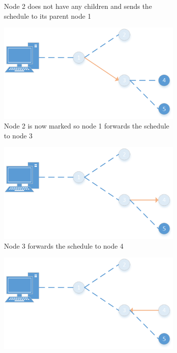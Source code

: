 \begin{figure}[htbp]
\begin{subfigure}[t]{0.4\textwidth}
        \caption{Node 2 does not have any children and sends the schedule to its parent node 1}
        \label{fig:spreading3}
    \end{subfigure}
    \quad
    \quad
    \begin{subfigure}[t]{0.4\textwidth}
		\centering         
        \includegraphics[scale=0.6]{content/images/ScheduleSpreading/Part4}
        \caption{Node 2 is now marked so node 1 forwards the schedule to node 3}
        \label{fig:spreading4}
    \end{subfigure}
    \quad
    \quad
    \begin{subfigure}[t]{0.4\textwidth}
		\centering         
        \includegraphics[scale=0.6]{content/images/ScheduleSpreading/Part5}
        \caption{Node 3 forwards the schedule to node 4}
        \label{fig:spreading5}
    \end{subfigure}
    \quad
    \quad
    \begin{subfigure}[t]{0.4\textwidth}
		\centering         
        \includegraphics[scale=0.6]{content/images/ScheduleSpreading/Part6}

\end{subfigure}
\end{figure}
